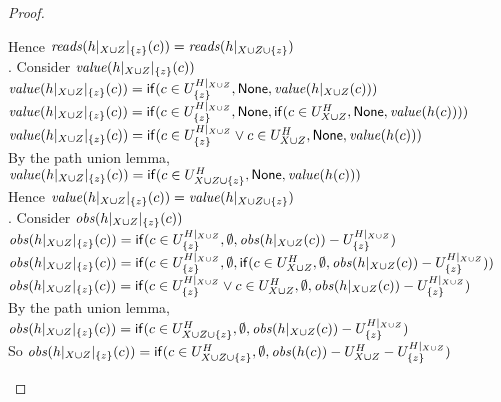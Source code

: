 \begin{proof}
\begin{tabbedproof}
\ooooo Hence $\mathit{reads}(h|_{X \cup Z}|_{\{{z}\}}(c)) = \mathit{reads}(h|_{X \cup Z \cup \{{z}\}})$ \\
. Consider $\mathit{value}(h|_{X \cup Z}|_{\{{z}\}}(c))$ \\
\ooooo $\mathit{value}(h|_{X \cup Z}|_{\{{z}\}}(c)) = \mathsf{if}({c \in U^{H|_{X \cup Z}}_{\{{z}\}}}, {\mathsf{None}}, {\mathit{value}(h|_{X \cup Z}(c))})$ \\
\ooooo $\mathit{value}(h|_{X \cup Z}|_{\{{z}\}}(c)) = \mathsf{if}({c \in U^{H|_{X \cup Z}}_{\{{z}\}}}, {\mathsf{None}}, {\mathsf{if}({c \in U^H_{X \cup Z}}, {\mathsf{None}}, {\mathit{value}(h(c))})})$ \\
\ooooo $\mathit{value}(h|_{X \cup Z}|_{\{{z}\}}(c)) = \mathsf{if}({c \in U^{H|_{X \cup Z}}_{\{{z}\}} \vee c \in U^H_{X \cup Z}}, {\mathsf{None}}, {\mathit{value}(h(c))})$ \\
\ooooo By the path union lemma, \\
\ooooox $\mathit{value}(h|_{X \cup Z}|_{\{{z}\}}(c)) = \mathsf{if}({c \in U^H_{X \cup Z \cup \{{z}\}}}, {\mathsf{None}}, {\mathit{value}(h(c))})$ \\
\ooooo Hence $\mathit{value}(h|_{X \cup Z}|_{\{{z}\}}(c)) = \mathit{value}(h|_{X \cup Z \cup \{{z}\}})$ \\
. Consider $\mathit{obs}(h|_{X \cup Z}|_{\{{z}\}}(c))$ \\
\ooooo $\mathit{obs}(h|_{X \cup Z}|_{\{{z}\}}(c)) = \mathsf{if}({c \in U^{H|_{X \cup Z}}_{\{{z}\}}}, {\emptyset}, {\mathit{obs}(h|_{X \cup Z}(c)) - U^{H|_{X \cup Z}}_{\{{z}\}}})$ \\
\ooooo $\mathit{obs}(h|_{X \cup Z}|_{\{{z}\}}(c)) = \mathsf{if}({c \in U^{H|_{X \cup Z}}_{\{{z}\}}}, {\emptyset}, {\mathsf{if}({c \in U^H_{X \cup Z}}, {\emptyset}, {\mathit{obs}(h|_{X \cup Z}(c)) - U^{H|_{X \cup Z}}_{\{{z}\}}})})$ \\
\ooooo $\mathit{obs}(h|_{X \cup Z}|_{\{{z}\}}(c)) = \mathsf{if}({c \in U^{H|_{X \cup Z}}_{\{{z}\}} \vee c \in U^H_{X \cup Z}}, {\emptyset}, {\mathit{obs}(h|_{X \cup Z}(c)) - U^{H|_{X \cup Z}}_{\{{z}\}}})$ \\
\ooooo By the path union lemma, \\
\ooooox $\mathit{obs}(h|_{X \cup Z}|_{\{{z}\}}(c)) = \mathsf{if}({c \in U^H_{X \cup Z \cup \{{z}\}}}, {\emptyset}, {\mathit{obs}(h|_{X \cup Z}(c)) - U^{H|_{X \cup Z}}_{\{{z}\}}})$ \\
\ooooo So $\mathit{obs}(h|_{X \cup Z}|_{\{{z}\}}(c)) = \mathsf{if}({c \in U^H_{X \cup Z \cup \{{z}\}}}, {\emptyset}, {\mathit{obs}(h(c)) - U^H_{X \cup Z} - U^{H|_{X \cup Z}}_{\{{z}\}}})$ \\

\end{tabbedproof}
\end{proof}
